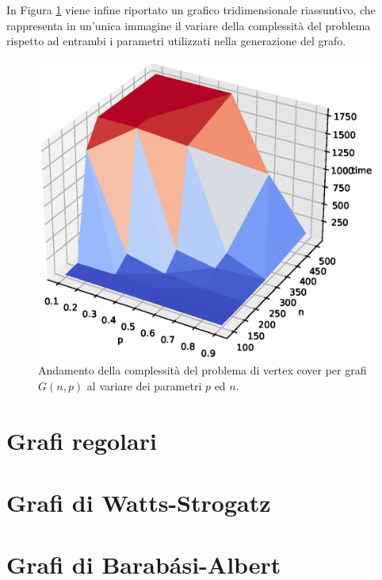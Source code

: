In Figura \ref{fig:gnp3d} viene infine riportato un grafico tridimensionale riassuntivo, che rappresenta in un'unica immagine il variare della complessità del problema rispetto ad entrambi i parametri utilizzati nella generazione del grafo.
\vspace{-0cm}
\begin{figure}[h!]
     \centering
       \includegraphics[scale=0.5]{images/gnp-3d.eps}
       \caption{Andamento della complessità del problema di vertex cover per grafi $G(n,p)$ al variare dei parametri $p$ ed $n$.}
        \label{fig:gnp3d}
\end{figure}

\section{Grafi regolari}

\section{Grafi di Watts-Strogatz}

\section{Grafi di Barabási-Albert}